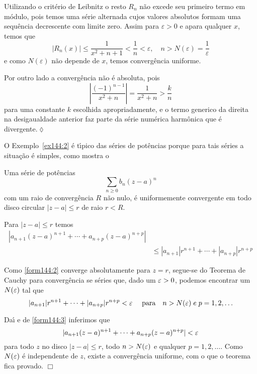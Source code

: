 \solo Utilizando o crit\'{e}rio de Leibnitz o resto $R_n$ n\~{a}o excede
seu primeiro termo em m\'{o}dulo, pois temos uma s\'{e}rie alternada cujos
valores absolutos formam uma sequ\^{e}ncia decrescente  com limite
zero. Assim para $\varepsilon>0$ e apara qualquer $x$, temos que
\begin{equation*}
    |R_n(x)|\le \frac{1}{x^2+n+1}<\frac{1}{n}<\varepsilon,\quad
    n>N(\varepsilon)=\frac{1}{\varepsilon}
\end{equation*}
e como $N(\varepsilon)$ n\~{a}o depende de $x$, temos converg\^{e}ncia
uniforme.

Por outro lado a converg\^{e}ncia n\~{a}o \'{e} absoluta, pois
\begin{equation*}
    \left|\frac{(-1)^{n-1}}{x^2+n}\right|=\frac{1}{x^2+n}>\frac{k}{n}
\end{equation*}
para uma constante $k$ escolhida apropriadamente, e o termo
generico da direita na desigaualdade anterior faz parte da s\'{e}rie
num\'{e}rica harm\^{o}nica que \'{e} divergente.\hfill \(\lozenge\)


O Exemplo~\ref{ex144:2} \'{e} t\'{\i}pico das s\'{e}ries de pot\^{e}ncias porque
para tais s\'{e}ries a situa\c{c}\~{a}o \'{e} simples, como mostra o

\begin{teo}\label{orf144:1} Uma s\'{e}rie de pot\^{e}ncias
\begin{equation}\label{form144:2}
 \sum_{n\geq 0}b_n(z - a)^n
\end{equation}
com um raio de converg\^{e}ncia $R$ n\~{a}o nulo, \'{e} uniformemente
convergente em todo disco circular $|z-a|\le  r$ de raio $r < R$.
\end{teo}

\prova Para $|z - a|\le  r$ temos
\begin{align}
  |a_{n+1}(z-a)^{n+1}+\cdots+a_{n+p}(z-a)^{n+p}| & \nonumber \\
   &\le |a_{n+1}|r^{n+1}+\cdots+|a_{n+p}|r^{n+p}\label{form144:3}
\end{align}

Como \eqref{form144:2} converge absolutamente para $z = r$,
segue-se do Teorema de Cauchy para converg\^{e}ncia se s\'{e}ries que,
dado um $\varepsilon
> 0$, podemos encontrar um $N(\varepsilon)$ tal que
\begin{equation*}
|a_{n+1}|r^{n+1}+\cdots+|a_{n+p}|r^{n+p} < \varepsilon\quad \text{
para}\quad n> N(\varepsilon) \; e \; p = 1, 2,\ldots
\end{equation*}

Da\'{\i} e de \eqref{form144:3} inferimos que
\begin{equation*}
|a_{n+1}(z-a)^{n+1}+\cdots+a_{n+p}(z-a)^{n+p}| < \varepsilon
\end{equation*}
para todo $z$ no disco $| z - a| \le r$, todo $n > N(\varepsilon)$ e
qualquer $p = 1, 2,\ldots$. Como $N(\varepsilon)$ \'{e} independente de $z$,
existe a converg\^{e}ncia uniforme, com o que o teorema fica provado.
\hfill $\Box$

